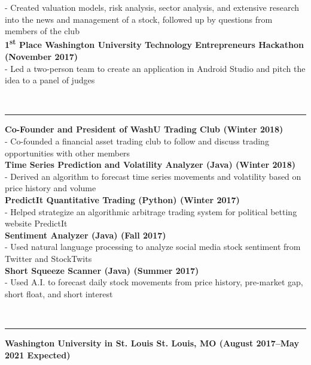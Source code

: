 \documentclass[12pt]{article}
\begin{document}
\begin{titlepage}
\begin{addmargin}[1em]{0em}
- Created valuation models, risk analysis, sector analysis, and extensive research into the news and management of a stock, followed up by questions from members of the club\\
			\textbf{1\textsuperscript{st} Place Washington University Technology Entrepreneurs Hackathon \hfill (November 2017)}\\
- Led a two-person team to create an application in Android Studio and pitch the idea to a panel of judges \\
		\end{addmargin}
		\vspace{-10pt}
		\noindent
		\\\rule{\textwidth}{0.4pt}
		\begin{addmargin}[1em]{0em}
			\textbf{Co-Founder and President of WashU Trading Club \hfill (Winter 2018)}\\
- Co-founded a financial asset trading club to follow and discuss trading opportunities with other members\\
			\textbf{Time Series Prediction and Volatility Analyzer (Java) \hfill (Winter 2018)}\\
- Derived an algorithm to forecast time series movements and volatility based on price history and volume \\
			\textbf{PredictIt Quantitative Trading (Python) \hfill (Winter 2017)}\\
- Helped strategize an algorithmic arbitrage trading system for political betting website PredictIt \\
			\textbf{Sentiment Analyzer (Java) \hfill (Fall 2017)}\\
- Used natural language processing to analyze social media stock sentiment from Twitter and StockTwits\\
			\textbf{Short Squeeze Scanner (Java) \hfill (Summer 2017)}\\
- Used A.I. to forecast daily stock movements from price history, pre-market gap, short float, and short interest\\
		\end{addmargin}
		\vspace{-10pt}
		\noindent
		\\\rule{\textwidth}{0.4pt}
		\begin{addmargin}[1em]{0em}
			\textbf{Washington University in St. Louis St. Louis, MO \hfill (August 2017–May 2021 Expected)}\\

\end{addmargin}
\end{titlepage}
\end{document}
